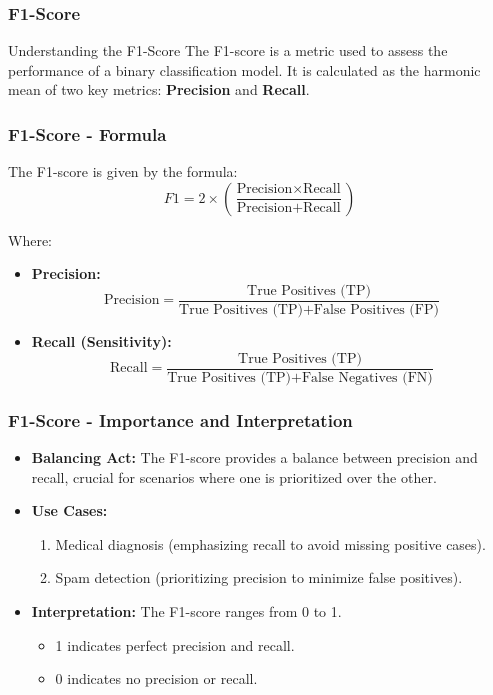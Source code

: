 \documentclass[aspectratio=169]{beamer}
\begin{document}
\begin{frame}[fragile]
    \frametitle{F1-Score}
    \begin{block}{Understanding the F1-Score}
        The F1-score is a metric used to assess the performance of a binary classification model. It is calculated as the harmonic mean of two key metrics: \textbf{Precision} and \textbf{Recall}.
    \end{block}
\end{frame}

\begin{frame}[fragile]
    \frametitle{F1-Score - Formula}
    The F1-score is given by the formula:
    \begin{equation}
        F1 = 2 \times \left( \frac{\text{Precision} \times \text{Recall}}{\text{Precision} + \text{Recall}} \right)
    \end{equation}
    
    Where:
    \begin{itemize}
        \item \textbf{Precision:} 
        \begin{equation}
            \text{Precision} = \frac{\text{True Positives (TP)}}{\text{True Positives (TP)} + \text{False Positives (FP)}}
        \end{equation}
        \item \textbf{Recall (Sensitivity):} 
        \begin{equation}
            \text{Recall} = \frac{\text{True Positives (TP)}}{\text{True Positives (TP)} + \text{False Negatives (FN)}}
        \end{equation}
    \end{itemize}
\end{frame}

\begin{frame}[fragile]
    \frametitle{F1-Score - Importance and Interpretation}
    \begin{itemize}
        \item \textbf{Balancing Act:} The F1-score provides a balance between precision and recall, crucial for scenarios where one is prioritized over the other.
        \item \textbf{Use Cases:} 
        \begin{enumerate}
            \item Medical diagnosis (emphasizing recall to avoid missing positive cases).
            \item Spam detection (prioritizing precision to minimize false positives).
        \end{enumerate}
        \item \textbf{Interpretation:} The F1-score ranges from 0 to 1. 
        \begin{itemize}
            \item 1 indicates perfect precision and recall.
            \item 0 indicates no precision or recall.
        \end{itemize}
    \end{itemize}
\end{frame}
\end{document}
